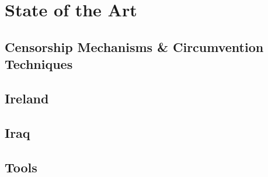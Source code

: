 \chapter{State of the Art}
\section{Censorship Mechanisms \& Circumvention Techniques}



\section{Ireland}

\section{Iraq}

\section{Tools}
